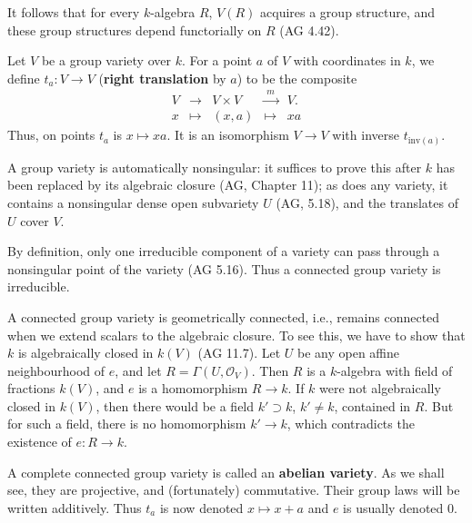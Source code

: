 

It follows that for every $k$-algebra $R$, $V(R)$ acquires a group structure,
and these group structures depend functorially on $R$ (AG 4.42).

Let $V$ be a group variety over $k$. For a point $a$ of $V$ with coordinates
in $k$, we define $t_a : V \to V$ (\textbf{right translation} by $a$) to be
the composite
\[
  \begin{array}{ccccc}
    V & \to & V \times V & \xrightarrow{\;m\;} & V. \\
    x & \mapsto & (x, a) & \mapsto & xa
  \end{array}
\]
Thus, on points $t_a$ is $x \mapsto xa$. It is an isomorphism $V \to V$ with
inverse $t_{\mathrm{inv}(a)}$.

A group variety is automatically nonsingular: it suffices to prove this
after $k$ has been replaced by its algebraic closure (AG, Chapter 11); as
does any variety, it contains a nonsingular dense open subvariety $U$
(AG, 5.18), and the translates of $U$ cover $V$.

By definition, only one irreducible component of a variety can pass through
a nonsingular point of the variety (AG 5.16). Thus a connected group variety
is irreducible.

A connected group variety is geometrically connected, i.e., remains
connected when we extend scalars to the algebraic closure. To see this, we
have to show that $k$ is algebraically closed in $k(V)$ (AG 11.7). Let $U$
be any open affine neighbourhood of $e$, and let
$R = \Gamma(U, \mathcal{O}_V)$. Then $R$ is a $k$-algebra with field of
fractions $k(V)$, and $e$ is a homomorphism $R \to k$. If $k$ were not
algebraically closed in $k(V)$, then there would be a field $k' \supset k$,
$k' \ne k$, contained in $R$. But for such a field, there is no homomorphism
$k' \to k$, which contradicts the existence of $e : R \to k$.

A complete connected group variety is called an \textbf{abelian variety}.
As we shall see, they are projective, and (fortunately) commutative. Their
group laws will be written additively. Thus $t_a$ is now denoted
$x \mapsto x + a$ and $e$ is usually denoted $0$.

